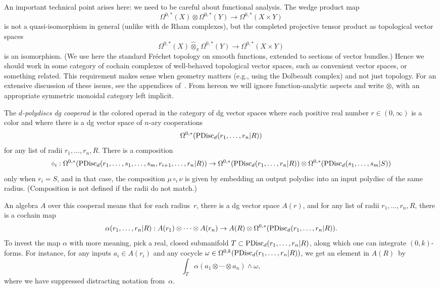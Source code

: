 \documentclass[11pt]{amsart}
\begin{document}
An important technical point arises here: 
we need to be careful about functional analysis.
The wedge product map
\[
\Omega^{0,*}(X) \otimes \Omega^{0,*}(Y) \to \Omega^{0,*}(X \times Y)
\]
is not a quasi-isomorphism in general (unlike with de Rham complexes),
but the completed projective tensor product as topological vector spaces 
\[
\Omega^{0,*}(X) \widehat{\otimes}_\pi \Omega^{0,*}(Y) \to \Omega^{0,*}(X \times Y)
\]
is an isomorphism.
(We use here the standard Fr\'echet topology on smooth functions, extended to sections of vector bundles.)
Hence we should work in some category of cochain complexes of well-behaved topological vector spaces, such as convenient vector spaces, or something related.
This requirement makes sense when geometry matters (e.g., using the Dolbeault complex) and not just topology.
For an extensive discussion of these issues, see the appendices of~\cite{CG1}.
From hereon we will ignore function-analytic aspects and write $\otimes$,
with an appropriate symmetric monoidal category left implicit.

\begin{dfn}
The {\em $d$-polydiscs dg cooperad} is the colored operad in the category of dg vector spaces where each positive real number $r \in (0,\infty)$ is a color 
and where there is a dg vector space of $n$-ary cooperations
\[
\Omega^{0,*}({\rm PDisc}_d(r_1, \ldots, r_n| R)) 
\]
for any list of radii $r_1,\ldots, r_n, R$.
There is a composition
\[
\circ_i: \Omega^{0,*}({\rm PDisc}_d(r_1, \ldots, s_1, \ldots, s_m, r_{i+1}, \ldots, r_n| R))\to \Omega^{0,*}({\rm PDisc}_d(r_1, \ldots, r_n| R)) \otimes \Omega^{0,*}({\rm PDisc}_d(s_1, \ldots, s_m| S))
\]
only when $r_i = S$, 
and in that case, the composition $\mu \circ_i \nu$ is given by embedding an output polydisc into an input polydisc of the same radius.
(Composition is not defined if the radii do not match.)
\end{dfn}

An algebra $A$ over this cooperad means that for each radius~$r$, 
there is a dg vector space $A(r)$, and for any list of radii $r_1,\ldots, r_n, R$,
there is a cochain map
\[
\alpha(r_1, \ldots, r_n| R): A(r_1) \otimes \cdots \otimes A(r_n) \to A(R) \otimes \Omega^{0,*}({\rm PDisc}_d(r_1, \ldots, r_n| R)) .
\]
To invest the map $\alpha$ with more meaning, 
pick a real, closed submanifold $T \subset {\rm PDisc}_d(r_1, \ldots, r_n| R)$, along which one can integrate $(0,k)$-forms.
For instance, for any inputs $a_i \in A(r_i)$ and any cocycle $\omega \in \Omega^{0,k}({\rm PDisc}_d(r_1, \ldots, r_n| R))$, we get an element in $A(R)$~by
\[
\int_T \alpha(a_1 \otimes \cdots \otimes a_n) \wedge \omega,
\]
where we have suppressed distracting notation from~$\alpha$.
\end{document}
